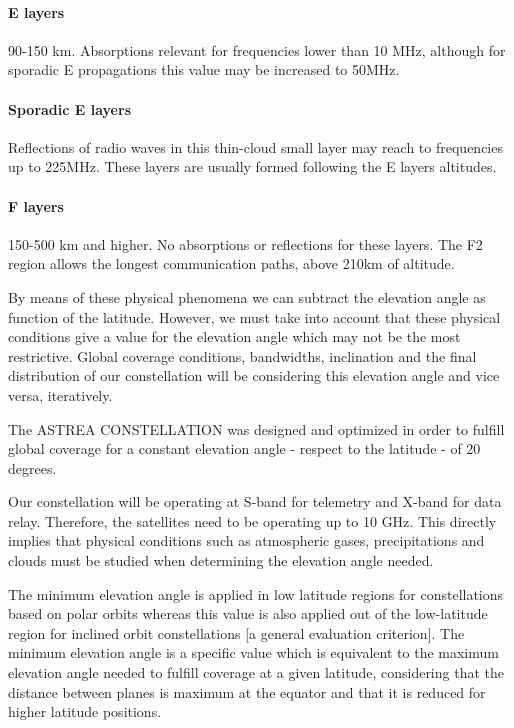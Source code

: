 \paragraph{E layers} 90-150 km. Absorptions relevant for frequencies lower than 10 MHz, although for sporadic E propagations this value may be increased to 50MHz.

\paragraph{Sporadic E layers} Reflections of radio waves in this thin-cloud small layer may reach to frequencies up to 225MHz. These layers are usually formed following the E layers altitudes.

\paragraph{F layers} 150-500 km and higher. No absorptions or reflections for these layers. The F2 region allows the longest communication paths, above 210km of altitude.

By means of these physical phenomena we can subtract the elevation angle as function of the latitude. However, we must take into account that these physical conditions give a value for the elevation angle which may not be the most restrictive. Global coverage conditions, bandwidths, inclination and the final distribution of our constellation will be considering this elevation angle and vice versa, iteratively.

The ASTREA CONSTELLATION was designed and optimized in order to fulfill global coverage for a constant elevation angle - respect to the latitude - of 20 degrees.

Our constellation will be operating at S-band for telemetry and X-band for data relay. Therefore, the satellites need to be operating up to 10 GHz. This directly implies that physical conditions such as atmospheric gases, precipitations and clouds must be studied when determining the elevation angle needed.

The minimum elevation angle is applied in low latitude regions for constellations based on polar orbits whereas this value is also applied out of the low-latitude region for inclined orbit constellations [a general evaluation criterion]. The minimum elevation angle is a specific value which is equivalent to the maximum elevation angle needed to fulfill coverage at a given latitude, considering that the distance between planes is maximum at the equator and that it is reduced for higher latitude positions.

